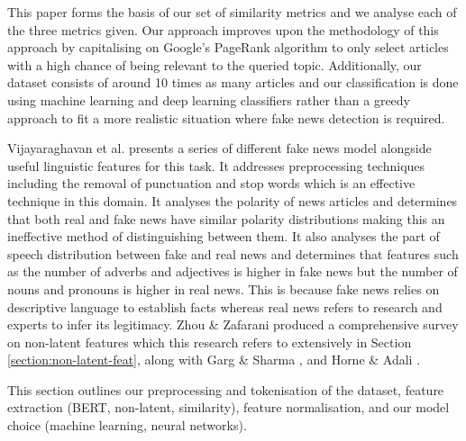\documentclass{article}
\begin{document}
This paper forms the basis of our set of similarity metrics and we analyse each of the three metrics given. Our approach improves upon the methodology of this approach by capitalising on Google's PageRank algorithm to only select articles with a high chance of being relevant to the queried topic. Additionally, our dataset consists of around 10 times as many articles and our classification is done using machine learning and deep learning classifiers rather than a greedy approach to fit a more realistic situation where fake news detection is required.

Vijayaraghavan et al. \cite{vijayaraghavan2020fake} presents a series of different fake news model alongside useful linguistic features for this task. It addresses preprocessing techniques including the removal of punctuation and stop words which is an effective technique in this domain. It analyses the polarity of news articles and determines that both real and fake news have similar polarity distributions making this an ineffective method of distinguishing between them. It also analyses the part of speech distribution between fake and real news and determines that features such as the number of adverbs and adjectives is higher in fake news but the number of nouns and pronouns is higher in real news. This is because fake news relies on descriptive language to establish facts whereas real news refers to research and experts to infer its legitimacy. Zhou \& Zafarani \cite{zhou2020survey} produced a comprehensive survey on non-latent features which this research refers to extensively in Section \ref{section:non-latent-feat}, along with Garg \& Sharma \cite{garg2022linguistic}, and Horne \& Adali \cite{horne2017}.

\label{section:methods}
This section outlines our preprocessing and tokenisation of the dataset, feature extraction (BERT, non-latent, similarity), feature normalisation, and our model choice (machine learning, neural networks).\\
\end{document}
